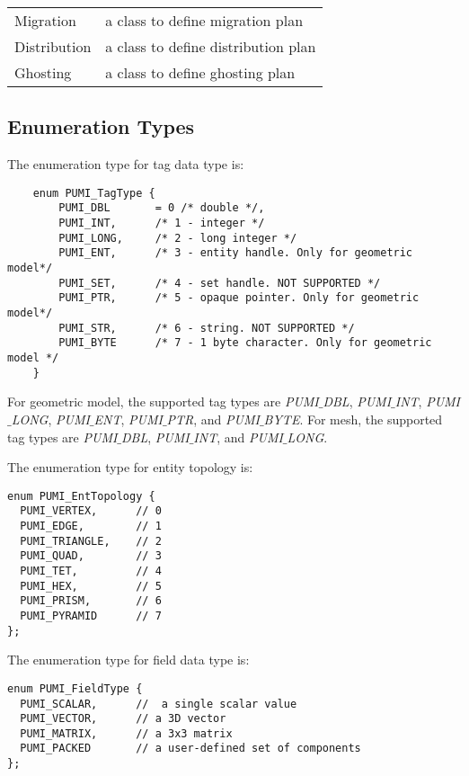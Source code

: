 \begin{tabular}{lp{14cm}}	
	Migration &	a class to define migration plan \\
	Distribution &	a class to define distribution plan \\
	Ghosting &	a class to define ghosting plan \\
\end{tabular}	

\subsection{Enumeration Types}

The enumeration type for tag data type is:

\begin{verbatim}
    enum PUMI_TagType {
        PUMI_DBL       = 0 /* double */,
        PUMI_INT,      /* 1 - integer */
        PUMI_LONG,     /* 2 - long integer */
        PUMI_ENT,      /* 3 - entity handle. Only for geometric model*/
        PUMI_SET,      /* 4 - set handle. NOT SUPPORTED */
        PUMI_PTR,      /* 5 - opaque pointer. Only for geometric model*/
        PUMI_STR,      /* 6 - string. NOT SUPPORTED */
        PUMI_BYTE      /* 7 - 1 byte character. Only for geometric model */
    }
\end{verbatim}\vspace{-1cm}\hspace{1cm}

For geometric model, the supported tag types are \emph{PUMI$\_$DBL}, \emph{PUMI$\_$INT}, \emph{PUMI$\_$LONG}, \emph{PUMI$\_$ENT}, \emph{PUMI$\_$PTR}, and \emph{PUMI$\_$BYTE}. For mesh, the supported tag types are \emph{PUMI$\_$DBL}, \emph{PUMI$\_$INT}, and \emph{PUMI$\_$LONG}.

The enumeration type for entity topology is:

\begin{verbatim}
enum PUMI_EntTopology {
  PUMI_VERTEX, 		// 0 
  PUMI_EDGE,   		// 1 
  PUMI_TRIANGLE, 	// 2 
  PUMI_QUAD,		// 3
  PUMI_TET,  		// 4
  PUMI_HEX,  		// 5 
  PUMI_PRISM, 		// 6
  PUMI_PYRAMID 		// 7
};
\end{verbatim}\vspace{-1cm}\hspace{1cm}

The enumeration type for field data type is:
\begin{verbatim}
enum PUMI_FieldType {
  PUMI_SCALAR, 		//  a single scalar value
  PUMI_VECTOR, 		// a 3D vector
  PUMI_MATRIX, 		// a 3x3 matrix 
  PUMI_PACKED 		// a user-defined set of components
};
\end{verbatim}\vspace{-1cm}\hspace{1cm}

